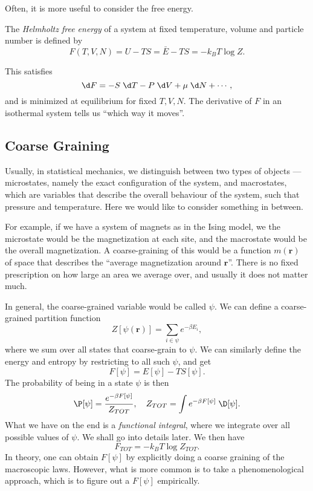 \documentclass[a4paper]{article}
\begin{document}
Often, it is more useful to consider the free energy.
\begin{defi}
  The \emph{Helmholtz free energy} of a system at fixed temperature, volume and particle number is defined by
  \[
    F(T, V, N) = U - TS = \bar{E} - TS = - k_B T \log Z.
  \]
\end{defi}
This satisfies
\[
  \d F = -S \;\d T - P\;\d V + \mu\;\d N + \cdots,
\]
and is minimized at equilibrium for fixed $T, V, N$. The derivative of $F$ in an isothermal system tells us ``which way it moves''.

\subsection{Coarse Graining}
Usually, in statistical mechanics, we distinguish between two types of objects --- microstates, namely the exact configuration of the system, and macrostates, which are variables that describe the overall behaviour of the system, such that pressure and temperature. Here we would like to consider something in between.

For example, if we have a system of magnets as in the Ising model, we the microstate would be the magnetization at each site, and the macrostate would be the overall magnetization. A coarse-graining of this would be a function $m(\mathbf{r})$ of space that describes the ``average magnetization around $\mathbf{r}$''. There is no fixed prescription on how large an area we average over, and usually it does not matter much.

In general, the coarse-grained variable would be called $\psi$. We can define a coarse-grained partition function
\[
  Z[\psi(\mathbf{r})] = \sum_{i \in \psi} e^{-\beta E_i},
\]
where we sum over all states that coarse-grain to $\psi$. We can similarly define the energy and entropy by restricting to all such $\psi$, and get
\[
  F[\psi] = E[\psi] - T S[\psi].
\]
The probability of being in a state $\psi$ is then
\[
  \P[\psi] = \frac{e^{-\beta F[\psi]}}{Z_{TOT}},\quad Z_{TOT} = \int e^{-\beta F[\psi]} \;\D [\psi].
\]
What we have on the end is a \emph{functional integral}, where we integrate over all possible values of $\psi$. We shall go into details later. We then have
\[
  F_{TOT} = -k_B T \log Z_{TOT}.
\]
In theory, one can obtain $F[\psi]$ by explicitly doing a coarse graining of the macroscopic laws. However, what is more common is to take a phenomenological approach, which is to figure out a $F[\psi]$ empirically.
\end{document}

